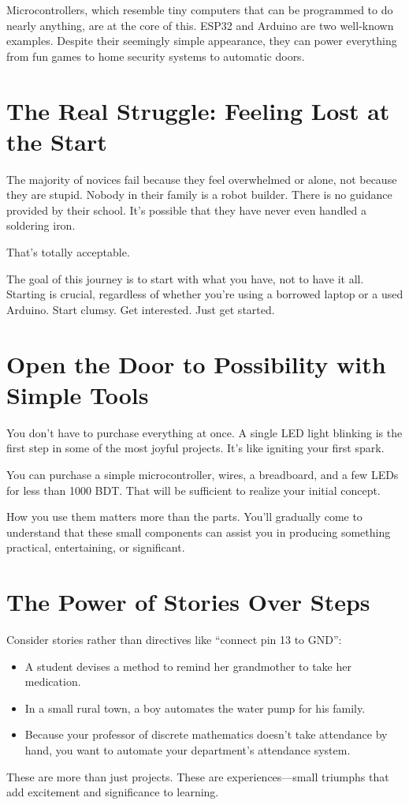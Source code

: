 \documentclass[a4paper,10pt,twocolumn]{memoir}
\begin{document}
{{{{{{Microcontrollers, which resemble tiny computers that can be programmed to do nearly anything, are at the core of this. ESP32 and Arduino are two well-known examples. Despite their seemingly simple appearance, they can power everything from fun games to home security systems to automatic doors.
\section*{The Real Struggle: Feeling Lost at the Start}
The majority of novices fail because they feel overwhelmed or alone, not because they are stupid. Nobody in their family is a robot builder. There is no guidance provided by their school. It’s possible that they have never even handled a soldering iron.

That’s totally acceptable.

The goal of this journey is to start with what you have, not to have it all. Starting is crucial, regardless of whether you’re using a borrowed laptop or a used Arduino. Start clumsy. Get interested. Just get started.
\section*{Open the Door to Possibility with Simple Tools}
You don’t have to purchase everything at once. A single LED light blinking is the first step in some of the most joyful projects. It’s like igniting your first spark.

You can purchase a simple microcontroller, wires, a breadboard, and a few LEDs for less than 1000 BDT. That will be sufficient to realize your initial concept.

How you use them matters more than the parts. You’ll gradually come to understand that these small components can assist you in producing something practical, entertaining, or significant.
\section*{The Power of Stories Over Steps}
Consider stories rather than directives like ``connect pin 13 to GND'':
\begin{itemize}
    \item A student devises a method to remind her grandmother to take her medication.
    \item In a small rural town, a boy automates the water pump for his family.
    \item Because your professor of discrete mathematics doesn’t take attendance by hand, you want to automate your department’s attendance system.
\end{itemize}
These are more than just projects. These are experiences—small triumphs that add excitement and significance to learning.
}}}}}}
\end{document}
